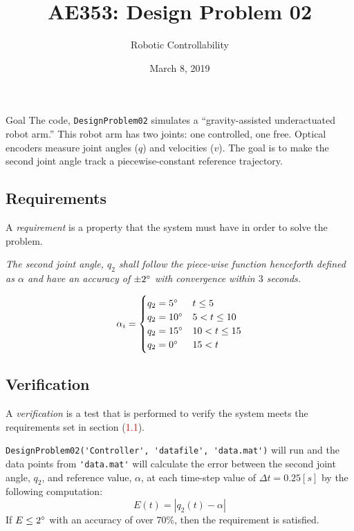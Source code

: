 \documentclass[12pt]{article}
\title{AE353: Design Problem 02}
\author{Robotic Controllability}
\date{March 8, 2019}
\begin{document}
\maketitle


\begin{section}{Goal}
The code, \lstinline!DesignProblem02! simulates a ``gravity-assisted underactuated robot arm.'' This robot arm has two joints: one controlled, one free.  Optical encoders measure joint angles ($q$) and velocities ($v$).  The goal is to make the second joint angle track a piecewise-constant reference trajectory.

\label{req}
\label{sec:1.1} \subsection{Requirements}
A \textit{requirement} is a property that the system must have in order to solve the problem.
\begin{adjustwidth}{20pt}{0pt}
    {\em The second joint angle, $q_2$ shall follow the piece-wise function henceforth defined as \emph{$\alpha$}  and have an accuracy of $\pm 2\degree$ with convergence within $3$ seconds.}
\end{adjustwidth}
\label{alpha}
\begin{equation}
    \alpha_i =
    \begin{cases}
        q_2 = 5\degree & t \leq 5 \\
        q_2 = 10\degree & 5 < t \leq 10 \\
        q_2 = 15\degree & 10 < t \leq 15 \\
        q_2 = 0\degree & 15 < t
    \end{cases}
\end{equation}

\subsection{Verification}
A \textit{verification} is a test that is performed to verify the system meets the requirements set in section (\textcolor{red}{1.1}).
\begin{adjustwidth}{20pt}{0pt}
    \lstinline{DesignProblem02('Controller', 'datafile', 'data.mat')} will run and the data points from \lstinline{'data.mat'} will calculate the error between the second joint angle, $q_2$, and reference value, $\alpha$, at each time-step value of $\Delta t = 0.25 [s]$ by the following computation:
    \[
    E(t) = |q_2(t) - \hyperref[alpha]{\alpha}|
    \] If $E \leq 2\degree$ with an accuracy of over 70\%, then the requirement is satisfied.
\end{adjustwidth}
\end{section}
\end{document}
